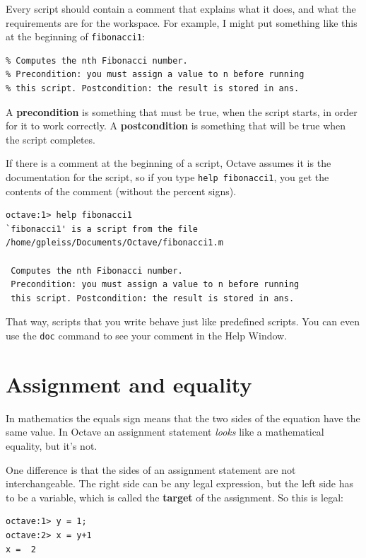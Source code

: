\documentclass{book}
\begin{document}
Every script should contain a comment that explains
what it does, and what the requirements are for the workspace. For
example, I might put something like this at the beginning of
{\tt fibonacci1}:

\begin{verbatim}
% Computes the nth Fibonacci number. 
% Precondition: you must assign a value to n before running 
% this script. Postcondition: the result is stored in ans.
\end{verbatim}

A {\bf precondition} is something that must be true, when the script
starts, in order for it to work correctly. A {\bf postcondition}
is something that will be true when the script completes.

If there is a comment at the beginning of a script, Octave assumes
it is the documentation for the script, so if you type {\tt help
fibonacci1}, you get the contents of the comment (without the percent
signs).

\begin{verbatim}
octave:1> help fibonacci1
`fibonacci1' is a script from the file
/home/gpleiss/Documents/Octave/fibonacci1.m

 Computes the nth Fibonacci number. 
 Precondition: you must assign a value to n before running 
 this script. Postcondition: the result is stored in ans.
\end{verbatim}

That way, scripts that you write behave just like predefined scripts.
You can even use the {\tt doc} command to see your comment in the
Help Window.

\section{Assignment and equality}

In mathematics the equals sign means that the two sides of the
equation have the same value. In Octave an assignment statement
{\em looks} like a mathematical equality, but it's not.

One difference is that the sides of an assignment statement are not
interchangeable. The right side can be any legal expression, but
the left side has to be a variable, which is called the {\bf
target} of the assignment. So this is legal:

\begin{verbatim}
octave:1> y = 1;
octave:2> x = y+1
x =  2
\end{verbatim}
\end{document}
